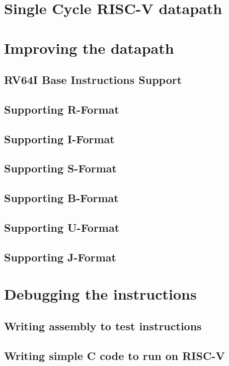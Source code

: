 \section{Single Cycle RISC-V datapath}

\section{Improving the datapath} 

    \subsection{RV64I Base Instructions Support}

    \subsection{Supporting R-Format}
    
    \subsection{Supporting I-Format}
    
    \subsection{Supporting S-Format}
    
    \subsection{Supporting B-Format}
    
    \subsection{Supporting U-Format}
    
    \subsection{Supporting J-Format}
    
\section{Debugging the instructions}

    \subsection{Writing assembly to test instructions}
    
    \subsection{Writing simple C code to run on RISC-V}
    
    
    

    